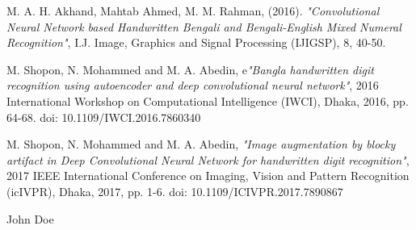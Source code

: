 \documentclass[conference]{IEEEtran}
\begin{document}
\begin{thebibliography}{1}
M. A. H. Akhand, Mahtab Ahmed, M. M. Rahman, (2016). \emph{"Convolutional Neural Network based Handwritten Bengali and Bengali-English Mixed Numeral Recognition"}, I.J. Image, Graphics and Signal Processing (IJIGSP), 8, 40-50.

M. Shopon, N. Mohammed and M. A. Abedin, e\emph{"Bangla handwritten digit recognition using autoencoder and deep convolutional neural network"}, 2016 International Workshop on Computational Intelligence (IWCI), Dhaka, 2016, pp. 64-68.
doi: 10.1109/IWCI.2016.7860340

M. Shopon, N. Mohammed and M. A. Abedin, \emph{"Image augmentation by blocky artifact in Deep Convolutional Neural Network for handwritten digit recognition"}, 2017 IEEE International Conference on Imaging, Vision and Pattern Recognition (icIVPR), Dhaka, 2017, pp. 1-6.
doi: 10.1109/ICIVPR.2017.7890867



\end{thebibliography}


% 

\begin{IEEEbiography}{John Doe}
\blindtext
\end{IEEEbiography}







\end{document}
